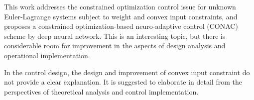 \documentclass[12pt,english]{reviewresponse}
\begin{document}
\reviewer
\begin{generalcomment}
	This work addresses the constrained optimization control issue for unknown Euler-Lagrange systems subject to weight and convex input constraints, and proposes a constrained optimization-based neuro-adaptive control (CONAC) scheme by deep neural network. This is an interesting topic, but there is considerable room for improvement in the aspects of design analysis and operational implementation. 
\end{generalcomment}

% 
\begin{revcomment}[2][1]{}
	In the control design, the design and improvement of convex input constraint do not provide a clear explanation. It is suggested to elaborate in detail from the perspectives of theoretical analysis and control implementation.
\end{revcomment}
\end{document}
